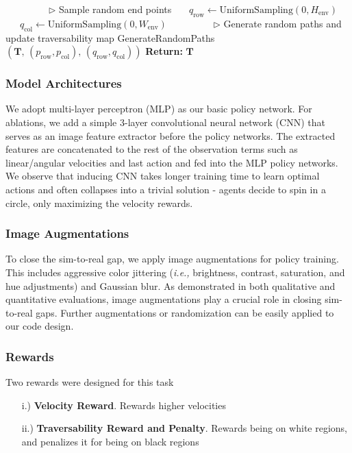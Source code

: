 \begin{appendices}
\begin{algorithm}[!ht]
\begin{algorithmic}[1]
    \Statex \ \ \ \ \ \ \ \ \ \(\triangleright\) Sample random end points
    \Do
      \State \ \ \ $q_\text{row} \gets \text{UniformSampling}(0, H_\text{env})$
      \State \ \ \ $q_\text{col} \gets \text{UniformSampling}(0, W_\text{env})$
    \Statex \ \ \ \ \ \ \ \ \ \(\triangleright\) Generate random paths and update traversability map
    \State GenerateRandomPaths$(\mathbf{T},\, (p_\text{row}, p_\text{col}),\, (q_\text{row}, q_\text{col}))$
  \EndFor
\EndFor
\State \textbf{Return:} $\mathbf{T}$
\end{algorithmic} 
\label{alg:visual_map_generation}
\end{algorithm}

\subsubsection{Model Architectures}
We adopt multi-layer perceptron (MLP) as our basic policy network.
For ablations, we add a simple 3-layer convolutional neural network (CNN) that serves as an image feature extractor before the policy networks.
The extracted features are concatenated to the rest of the observation terms such as linear/angular velocities and last action and fed into the MLP policy networks.
We observe that inducing CNN takes longer training time to learn optimal actions and often collapses into a trivial solution - agents decide to spin in a circle, only maximizing the velocity rewards.

\subsubsection{Image Augmentations}
To close the sim-to-real gap, we apply image augmentations for policy training. This includes aggressive color jittering (\textit{i.e.,} brightness, contrast, saturation, and hue adjustments) and Gaussian blur.
As demonstrated in both qualitative and quantitative evaluations, image augmentations play a crucial role in closing sim-to-real gaps.
Further augmentations or randomization can be easily applied to our code design.



\subsubsection{Rewards}
Two rewards were designed for this task
\begin{enumerate}
    \item[i.)] \textbf{Velocity Reward}. Rewards higher velocities
    \item[ii.)] \textbf{Traversability Reward and Penalty}. Rewards being on white regions, and penalizes it for being on black regions
\end{enumerate}


\end{appendices}
